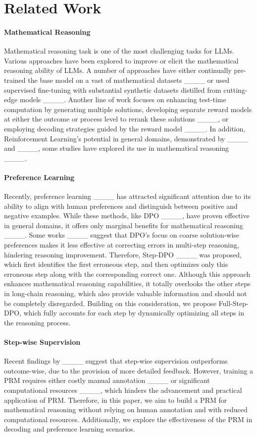 \section{Related Work}
\paragraph{Mathematical Reasoning}
Mathematical reasoning task is one of the most challenging tasks for LLMs. Various approaches have been explored to improve or elicit the mathematical reasoning ability of LLMs. 
A number of approaches have either continually pre-trained the base model on a vast of mathematical datasets ____ or used supervised fine-tuning with substantial synthetic datasets distilled from cutting-edge models ____.
Another line of work focuses on enhancing test-time computation by generating multiple solutions, developing separate reward models at either the outcome or process level to rerank these solutions ____, or employing decoding strategies guided by the reward model ____.
In addition, Reinforcement Learning’s potential in general domains, demonstrated by ____ and ____, some studies have explored its use in mathematical reasoning ____.



\paragraph{Preference Learning}
Recently, preference learning ____ has attracted significant attention due to its ability to align with human preferences and distinguish between positive and negative examples. While these methods, like DPO ____, have proven effective in general domains, it offers only marginal benefits for mathematical reasoning ____. Some works ____ suggest that DPO's focus on coarse solution-wise preferences makes it less effective at correcting errors in multi-step reasoning, hindering reasoning improvement. Therefore, Step-DPO ____ was proposed, which first identifies the first erroneous step, and then optimizes only this erroneous step along with the corresponding correct one. Although this approach enhances mathematical reasoning capabilities, it totally overlooks the other steps in long-chain reasoning, which also provide valuable information and should not be completely disregarded. Building on this consideration, we propose Full-Step-DPO, which fully accounts for each step by dynamically optimizing all steps in the reasoning process. 


\paragraph{Step-wise Supervision}
Recent findings by ____ suggest that step-wise supervision outperforms outcome-wise, due to the provision of more detailed feedback. 
However, training a PRM requires either costly manual annotation ____ or significant computational resources ____, which hinders the advancement and practical application of PRM.
Therefore, in this paper, we aim to build a PRM for mathematical reasoning without relying on human annotation and with reduced computational resources. 
Additionally, we explore the effectiveness of the PRM in decoding and preference learning scenarios.